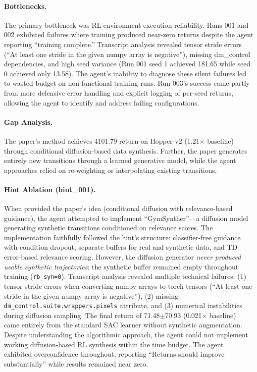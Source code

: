 \documentclass[11pt]{article}
\let\oldtexttt\texttt
\renewcommand{\texttt}[1]{{\fontseries{m}\selectfont\oldtexttt{#1}}}
\theoremstyle{plain}
\theoremstyle{definition}
\theoremstyle{remark}
\begin{document}
\paragraph{Bottlenecks.}
The primary bottleneck was RL environment execution reliability. Runs 001 and 002 exhibited failures where training produced near-zero returns despite the agent reporting ``training complete.'' Transcript analysis revealed tensor stride errors (``At least one stride in the given numpy array is negative''), missing dm\_control dependencies, and high seed variance (Run 001 seed 1 achieved 181.65 while seed 0 achieved only 13.58). The agent's inability to diagnose these silent failures led to wasted budget on non-functional training runs. Run 003's success came partly from more defensive error handling and explicit logging of per-seed returns, allowing the agent to identify and address failing configurations.

\paragraph{Gap Analysis.}
The paper's method achieves 4101.79 return on Hopper-v2 (1.21$\times$ baseline) through conditional diffusion-based data synthesis. Further, the paper generates entirely new transitions through a learned generative model, while the agent approaches relied on re-weighting or interpolating existing transitions.

\paragraph{Hint Ablation (hint\_001).} When provided the paper's idea (conditional diffusion with relevance-based guidance), the agent attempted to implement ``GymSynther''---a diffusion model generating synthetic transitions conditioned on relevance scores. The implementation faithfully followed the hint's structure: classifier-free guidance with condition dropout, separate buffers for real and synthetic data, and TD-error-based relevance scoring. However, the diffusion generator \textit{never produced usable synthetic trajectories}: the synthetic buffer remained empty throughout training (\texttt{rb\_syn=0}). Transcript analysis revealed multiple technical failures: (1) tensor stride errors when converting numpy arrays to torch tensors (``At least one stride in the given numpy array is negative''), (2) missing \texttt{dm\_control.suite.wrappers.pixels} attribute, and (3) numerical instabilities during diffusion sampling. The final return of 71.48$\pm$70.93 (0.021$\times$ baseline) came entirely from the standard SAC learner without synthetic augmentation. Despite understanding the algorithmic approach, the agent could not implement working diffusion-based RL synthesis within the time budget. The agent exhibited overconfidence throughout, reporting ``Returns should improve substantially'' while results remained near zero.
\end{document}
